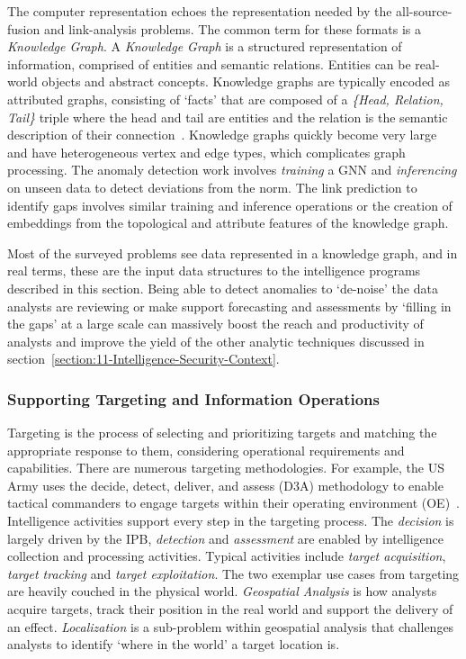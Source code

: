 The computer representation echoes the representation needed by the all-source-fusion and link-analysis problems. 
The common term for these formats is a \textit{Knowledge Graph}.
A \textit{Knowledge Graph} is a structured representation of information, comprised of entities and semantic relations. 
Entities can be real-world objects and abstract concepts. 
Knowledge graphs are typically encoded as attributed graphs, consisting of `facts' that are composed of a \textit{\{Head, Relation, Tail\}} triple where the head and tail are entities and the relation is the semantic description of their connection~\cite{Ji2021a}.
Knowledge graphs quickly become very large and have heterogeneous vertex and edge types, which complicates graph processing. 
The anomaly detection work involves \textit{training} a GNN and \textit{inferencing} on unseen data to detect deviations from the norm. 
The link prediction to identify gaps involves similar training and inference operations or the creation of embeddings from the topological and attribute features of the knowledge graph.   

Most of the surveyed problems see data represented in a knowledge graph, and in real terms, these are the input data structures to the intelligence programs described in this section.
Being able to detect anomalies to `de-noise' the data analysts are reviewing or make support forecasting and assessments by `filling in the gaps' at a large scale can massively boost the reach and productivity of analysts and improve the yield of the other analytic techniques discussed in section~\ref{section:11-Intelligence-Security-Context}. 


\subsubsection{Supporting Targeting and Information Operations}
\label{section:Supporting-Targeting-And-Information-Operations}
Targeting is the process of selecting and prioritizing targets and matching the appropriate response to them, considering operational requirements and capabilities. 
There are numerous targeting methodologies. 
For example, the US Army uses the decide, detect, deliver, and assess (D3A) methodology to enable tactical commanders to engage targets within their operating environment (OE)~\cite{Army2019a}.
Intelligence activities support every step in the targeting process. 
The \textit{decision} is largely driven by the IPB, \textit{detection} and \textit{assessment} are enabled by intelligence collection and processing activities.  
Typical activities include \textit{target acquisition}, \textit{target tracking} and \textit{target exploitation}.
The two exemplar use cases from targeting are heavily couched in the physical world. 
\textit{Geospatial Analysis} is how analysts acquire targets, track their position in the real world and support the delivery of an effect. 
\textit{Localization} is a sub-problem within geospatial analysis that challenges analysts to identify `where in the world' a target location is.

